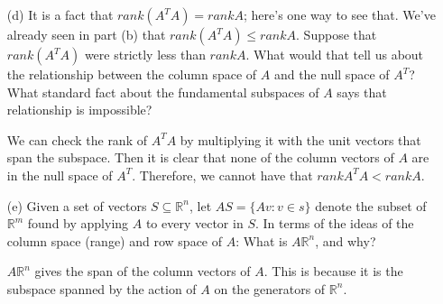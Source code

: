 \documentclass{article}
\begin{document}
\begin{itemize}
        \item [(d)] It is a fact that $rank(A^{T}A) = rank{A}$; here's one way to see that. We've already seen in part (b) that $rank(A^{T}A) \leq rank{A}$. Suppose that $rank(A^{T}A)$ were strictly less than $rank{A}$. What would that tell us about the relationship between the column space of $A$ and the null space of $A^{T}$? What standard fact about the fundamental subspaces of $A$ says  that relationship is impossible?
            \begin{answer}
                We can check the rank of $A^{T}A$ by multiplying it with the unit vectors that span the subspace. Then it is clear that none of the column vectors of $A$ are in the null space of $A^{T}$. Therefore, we cannot have that $rank{A^{T}A} < rank{A}$.
            \end{answer}

        \item [(e)] Given a set of vectors $S \subseteq \mathbb{R}^{n}$, let $AS = \{Av : v \in s\}$ denote the subset of $\mathbb{R}^{m}$ found by applying $A$ to every vector in $S$. In terms of the ideas of the column space (range) and row space of $A$: What is $A\mathbb{R}^{n}$, and why? 
            \begin{answer}
                $A\mathbb{R}^{n}$ gives the span of the column vectors of $A$. This is because it is the subspace spanned by the action of $A$ on the generators of $\mathbb{R}^{n}$.
            \end{answer}
    \end{itemize}
\end{document}
